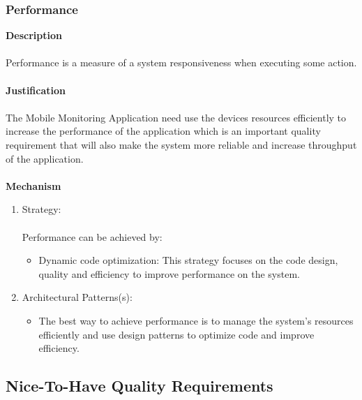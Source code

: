 \documentclass[hidelinks, 12pt, oneside]{article}
\begin{document}
			\subsubsection{Performance}
			\textbf{Description}\\\\
			Performance is a measure of a system responsiveness when executing some action.\\\\
			\textbf{Justification}\\\\
			The Mobile Monitoring Application need use the devices resources efficiently to increase the performance of the application which is an important quality requirement that will also make the system more reliable and increase throughput of the application.\\\\
			\textbf{Mechanism}
			\begin{enumerate}
				\item Strategy:\\\\
				Performance can be achieved by:
				\begin{itemize}
				\item Dynamic code optimization: This strategy focuses on the code design, quality and efficiency to improve performance on the system.  
				\end{itemize}
				\item Architectural Patterns(s):
				\begin{itemize}
				\item The best way to achieve performance is to manage the system's resources efficiently and use design patterns to optimize code and improve efficiency.   
				\end{itemize}
			\end{enumerate}	
			
		\newpage
		\subsection{Nice-To-Have Quality Requirements}
\end{document}
